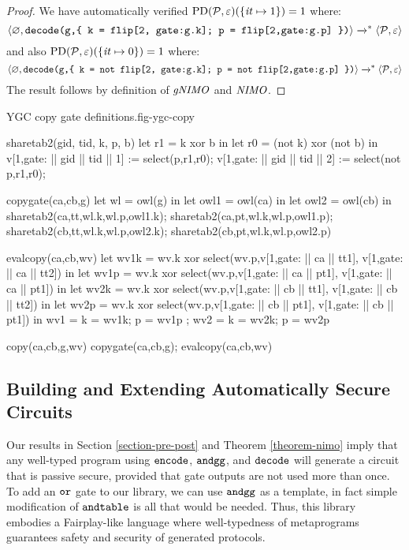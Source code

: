 \begin{proof}
  We have automatically verified $
  \mathrm{PD}(\mathcal{P},\varepsilon)(\{ \mathit{it} \mapsto 1 \}) = 1$ where:
  $$\langle \varnothing,\texttt{decode(g,\{ k = flip[2, gate:g.k]; p = flip[2,gate:g.p] \})} \rangle
    \xrightarrow{}^{*} \langle \mathcal{P},\varepsilon \rangle$$
    and also $
  \mathrm{PD}(\mathcal{P},\varepsilon)(\{ \mathit{it} \mapsto 0 \}) = 1$ where:
  $$\langle \varnothing,\texttt{decode(g,\{ k = not flip[2, gate:g.k]; p = not flip[2,gate:g.p] \})} \rangle
    \xrightarrow{}^{*} \langle \mathcal{P},\varepsilon \rangle$$
  The result follows by definition of $\mathit{gNIMO}$ and $\mathit{NIMO}$.
\end{proof}


\begin{fpfig}[t]{YGC copy gate definitions.}{fig-ygc-copy}
  {\footnotesize
    \begin{verbatimtab}
      sharetab2(gid, tid, k, p, b)
      {
        let r1 = k xor b in
        let r0 = (not k) xor (not b) in
        v[1,gate: || gid || tid || 1] := select(p,r1,r0);
        v[1,gate: || gid || tid || 2] := select(not p,r1,r0);
      }
      
      copygate(ca,cb,g)
      {
        let wl = owl(g) in
        let owl1 = owl(ca) in
        let owl2 = owl(cb) in
        sharetab2(ca,tt,wl.k,wl.p,owl1.k); sharetab2(ca,pt,wl.k,wl.p,owl1.p);
        sharetab2(cb,tt,wl.k,wl.p,owl2.k); sharetab2(cb,pt,wl.k,wl.p,owl2.p)
      }
      
      evalcopy(ca,cb,wv)
      {
        let wv1k = wv.k xor select(wv.p,v[1,gate: || ca || tt1], v[1,gate: || ca || tt2]) in
        let wv1p = wv.k xor select(wv.p,v[1,gate: || ca || pt1], v[1,gate: || ca || pt1]) in
        let wv2k = wv.k xor select(wv.p,v[1,gate: || cb || tt1], v[1,gate: || cb || tt2]) in
        let wv2p = wv.k xor select(wv.p,v[1,gate: || cb || pt1], v[1,gate: || cb || pt1]) in
        { wv1 = { k = wv1k; p = wv1p }; wv2 = { k = wv2k; p = wv2p } }  
      }

      copy(ca,cb,g,wv) { copygate(ca,cb,g); evalcopy(ca,cb,wv) } 
    \end{verbatimtab}
  }
\end{fpfig}

\subsection{Building and Extending Automatically Secure Circuits}
\label{section-composition-copy}

Our results in Section \ref{section-pre-post} and Theorem
\ref{theorem-nimo} imply that any well-typed program using
$\texttt{encode}$, $\texttt{andgg}$, and $\texttt{decode}$ will generate a
circuit that is passive secure, provided that gate outputs are
not used more than once. To add an $\texttt{or}$ gate to our
library, we can use $\texttt{andgg}$ as a template, in fact simple
modification of $\texttt{andtable}$ is all that would be needed. Thus,
this library embodies a Fairplay-like language where well-typedness
of metaprograms guarantees safety and security of generated protocols.

